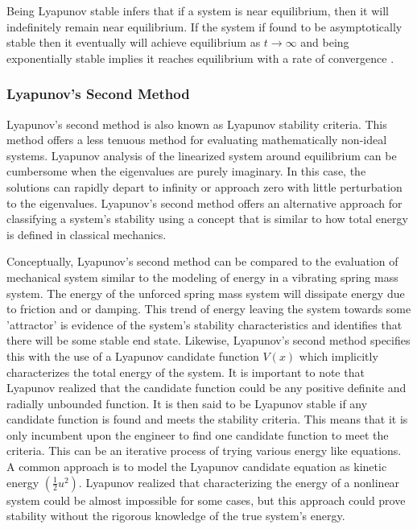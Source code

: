 Being Lyapunov stable infers that if a system is near equilibrium, then it will indefinitely remain near equilibrium.  If the system if found to be asymptotically stable then it eventually will achieve equilibrium as $t\to \infty$ and being exponentially stable implies it reaches equilibrium with a rate of convergence \beta.

\subsubsection{Lyapunov's Second Method}
 
Lyapunov's second method is also known as Lyapunov stability criteria.  This method offers a less tenuous method for evaluating mathematically non-ideal systems.  Lyapunov analysis of the linearized system around equilibrium can be cumbersome when the eigenvalues are purely imaginary.  In this case, the solutions can rapidly depart to infinity or approach zero with little perturbation to the eigenvalues.  Lyapunov's second method offers an alternative approach for classifying a system's stability using a concept that is similar to how total energy is defined in classical mechanics.

Conceptually, Lyapunov's second method can be compared to the evaluation of mechanical system similar to the modeling of energy in a vibrating spring mass system.  The energy of the unforced spring mass system will dissipate energy due to friction and or damping.  This trend of energy leaving the system towards some 'attractor' is evidence of the system's stability characteristics and identifies that there will be some stable end state.  Likewise, Lyapunov's second method specifies this with the use of a Lyapunov candidate function $V(x)$ which implicitly characterizes the total energy of the system.  It is important to note that Lyapunov realized that the candidate function could be any positive definite and radially unbounded function.  It is then said to be Lyapunov stable if any candidate function is found and meets the stability criteria.  This means that it is only incumbent upon the engineer to find one candidate function to meet the criteria.  This can be an iterative process of trying various energy like equations.  A common approach is to model the Lyapunov candidate equation as kinetic energy $(\frac{1}{2}u^2)$.  Lyapunov realized that characterizing the energy of a nonlinear system could be almost impossible for some cases, but this approach could prove stability without the rigorous knowledge of the true system's energy.

